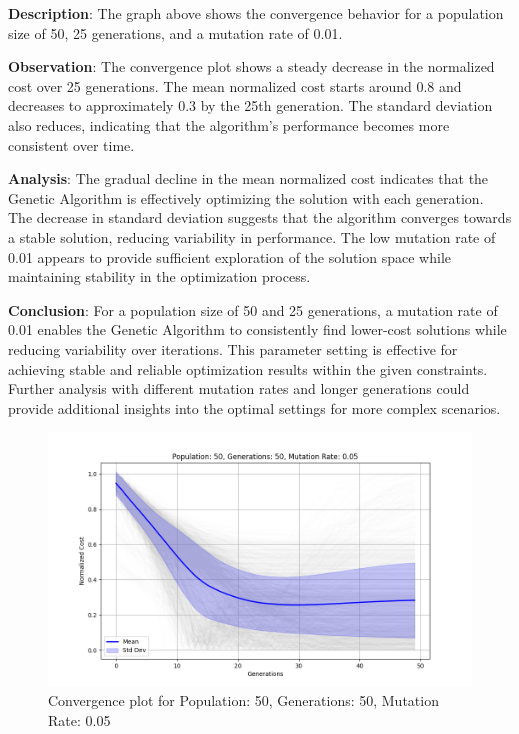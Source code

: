 \documentclass[
]{article}
\begin{document}
    \textbf{Description}: The graph above shows the convergence behavior for a population size of 50, 25 generations, and a mutation rate of 0.01.

    \textbf{Observation}: The convergence plot shows a steady decrease in the normalized cost over 25 generations. The mean normalized cost starts around 0.8 and decreases to approximately 0.3 by the 25th generation. The standard deviation also reduces, indicating that the algorithm's performance becomes more consistent over time.

    \textbf{Analysis}: The gradual decline in the mean normalized cost indicates that the Genetic Algorithm is effectively optimizing the solution with each generation. The decrease in standard deviation suggests that the algorithm converges towards a stable solution, reducing variability in performance. The low mutation rate of 0.01 appears to provide sufficient exploration of the solution space while maintaining stability in the optimization process.

    \textbf{Conclusion}: For a population size of 50 and 25 generations, a mutation rate of 0.01 enables the Genetic Algorithm to consistently find lower-cost solutions while reducing variability over iterations. This parameter setting is effective for achieving stable and reliable optimization results within the given constraints. Further analysis with different mutation rates and longer generations could provide additional insights into the optimal settings for more complex scenarios.

    \begin{figure}[H]
        \centering
        \includegraphics[width=\textwidth]{genetic_algorithm/Population_50_Generations_50_MutationRate_0.05}
        \caption{Convergence plot for Population: 50, Generations: 50, Mutation Rate: 0.05}
        \label{fig:ga_50_50_05}
    \end{figure}
\end{document}
